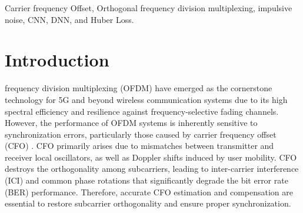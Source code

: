 \documentclass[10pt, journal]{IEEEtran}
\begin{document}
\begin{IEEEkeywords}
    Carrier frequency Offset, Orthogonal frequency division multiplexing, impulsive noise, CNN, DNN, and Huber Loss.
\end{IEEEkeywords}


\section{Introduction}
 frequency division multiplexing (OFDM) have emerged as the cornerstone technology for 5G and beyond wireless communication systems due to its high spectral efficiency and resilience against frequency-selective fading channels. However, the performance of OFDM systems is inherently sensitive to synchronization errors, particularly those caused by carrier frequency offset (CFO) \cite{vandebeek1997ml}. CFO primarily arises due to mismatches between transmitter and receiver local oscillators, as well as Doppler shifts induced by user mobility. CFO destroys the orthogonality among subcarriers, leading to inter-carrier interference (ICI) and common phase rotations that significantly degrade the bit error rate (BER) performance. Therefore, accurate CFO estimation and compensation are essential to restore subcarrier orthogonality and ensure proper synchronization. 

\end{document}
